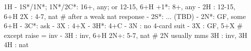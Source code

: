 1H - 1S*/1N*; 1N*/2C*: 16+, any; or 12-15, 6+H
+1*: 8+, any
   - 2H : 12-15, 6+H
2X : 4-7, nat
# after a weak nat response
   - 2S*: ... (TBD)
   - 2N*: GF, some 6+H
        - 3C*: ask
             - 3X : 4+X
             - 3H*: 4+C
             - 3N : no 4-card suit
   - 3X : GF, 5+X  # except raise = inv
   - 3H : inv, 6+H
2N+: 5-7, nat  # 2N usually mms
3H : inv, 3H
4H : nat